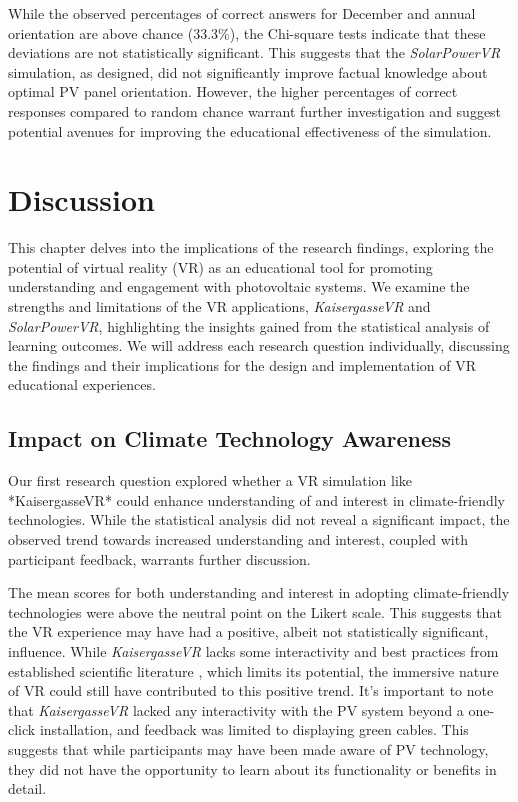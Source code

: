 \documentclass[draft, final]{vutinfth} %
\begin{document}
While the observed percentages of correct answers for December and annual orientation are above chance (33.3\%), the Chi-square tests indicate that these deviations are not statistically significant. This suggests that the \textit{SolarPowerVR} simulation, as designed, did not significantly improve factual knowledge about optimal PV panel orientation. However, the higher percentages of correct responses compared to random chance warrant further investigation and suggest potential avenues for improving the educational effectiveness of the simulation.


\chapter{Discussion}

This chapter delves into the implications of the research findings, exploring the potential of virtual reality (VR) as an educational tool for promoting understanding and engagement with photovoltaic systems. We examine the strengths and limitations of the VR applications, \textit{KaisergasseVR} and \textit{SolarPowerVR}, highlighting the insights gained from the statistical analysis of learning outcomes. We will address each research question individually, discussing the findings and their implications for the design and implementation of VR educational experiences.

\section{Impact on Climate Technology Awareness}

Our first research question explored whether a VR simulation like *KaisergasseVR* could enhance understanding of and interest in climate-friendly technologies. While the statistical analysis did not reveal a significant impact, the observed trend towards increased understanding and interest, coupled with participant feedback, warrants further discussion.

The mean scores for both understanding and interest in adopting climate-friendly technologies were above the neutral point on the Likert scale. This suggests that the VR experience may have had a positive, albeit not statistically significant, influence. While \textit{KaisergasseVR} lacks some interactivity and best practices from established scientific literature \cite{Dalgarno2010Learning, Gee2009Deep}, which limits its potential, the immersive nature of VR could still have contributed to this positive trend. It's important to note that \textit{KaisergasseVR} lacked any interactivity with the PV system beyond a one-click installation, and feedback was limited to displaying green cables. This suggests that while participants may have been made aware of PV technology, they did not have the opportunity to learn about its functionality or benefits in detail.
\end{document}
